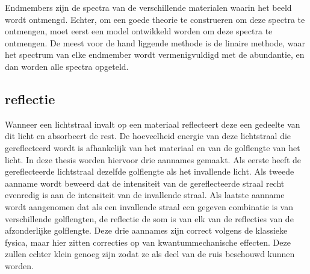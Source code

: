 \documentclass[12pt]{report}
\begin{document}
Endmembers zijn de spectra van de verschillende materialen waarin het beeld wordt ontmengd. Echter, om een goede theorie te construeren om deze spectra te ontmengen, moet eerst een model ontwikkeld worden om deze spectra te ontmengen. De meest voor de hand liggende methode is de linaire methode, waar het spectrum van elke endmember wordt vermenigvuldigd met de abundantie, en dan worden alle spectra opgeteld. 

\subsection{reflectie}


Wanneer een lichtstraal invalt op een materiaal reflecteert deze een gedeelte van dit licht en absorbeert de rest. De hoeveelheid energie van deze lichtstraal die gereflecteerd wordt is afhankelijk van het materiaal en van de golflengte van het licht. In deze thesis worden hiervoor drie aannames gemaakt. Als eerste heeft de gereflecteerde lichtstraal dezelfde golflengte als het invallende licht. Als tweede aanname wordt beweerd dat de intensiteit van de gereflecteerde straal recht evenredig is aan de intensiteit van de invallende straal. Als laatste aanname wordt aangenomen dat als een invallende straal een gegeven combinatie is van verschillende golflengten, de reflectie de som is van elk van de  reflecties van de afzonderlijke golflengte. Deze drie aannames zijn correct volgens de klassieke fysica, maar hier zitten correcties op van kwantummechanische effecten. Deze zullen echter klein genoeg zijn zodat ze als deel van de ruis beschouwd kunnen worden.
\end{document}
